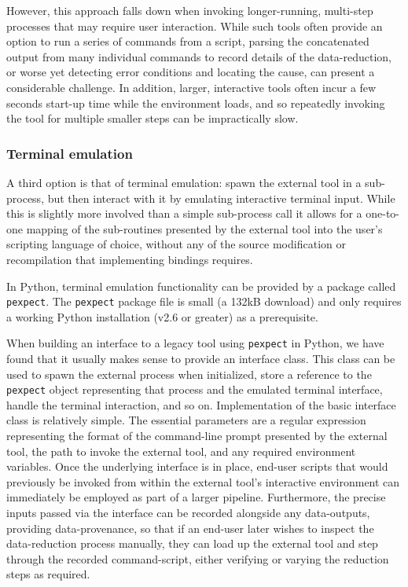 \documentclass[5p,authoryear]{elsarticle}
\begin{document}
However, this approach falls down when invoking longer-running, 
multi-step processes that may require user interaction. 
While such tools often provide an option
to run a series of commands from a script, parsing the concatenated output 
from many individual commands to record details of the data-reduction, 
or worse yet detecting error conditions and locating the cause, 
can present a considerable challenge. 
In addition, larger, interactive tools often incur a few seconds start-up
time while the environment loads, and so repeatedly invoking the tool for 
multiple smaller steps can be impractically slow. 

\subsubsection{Terminal emulation}
\label{sec:emulation}
A third option is that of terminal emulation: spawn the external tool in a sub-process, but then interact with it by emulating interactive terminal input.
While this is slightly more involved than a simple sub-process call it allows for a one-to-one mapping of the sub-routines presented by the external tool into the user's scripting language of choice, without any of the source modification or recompilation that implementing bindings requires. 

In Python, terminal emulation functionality can be provided by a package called \texttt{pexpect}.
The \texttt{pexpect} package file is small (a 132kB download) and only requires a working Python installation (v2.6 or greater) as a prerequisite. 

When building an interface to a legacy tool using \texttt{pexpect} in Python, we have found that it usually makes sense to provide an interface class. 
This class can be used to spawn the external process when initialized, store a reference to the \texttt{pexpect} object representing that process and the emulated terminal interface, handle the terminal interaction, and so on. 
Implementation of the basic interface class is relatively simple. 
The essential parameters are a regular expression representing the format of the command-line prompt presented by the external tool, the path to invoke the external tool, and any required environment variables.
Once the underlying interface is in place, end-user scripts that would previously be invoked from within the external tool's interactive environment can immediately be employed as part of a larger pipeline. 
Furthermore, the precise inputs passed via the interface can be recorded alongside any data-outputs, providing data-provenance, so that if an end-user later wishes to inspect the data-reduction process manually, they can load up the external tool and step through the recorded command-script, either verifying or varying the reduction steps as required.
\end{document}
